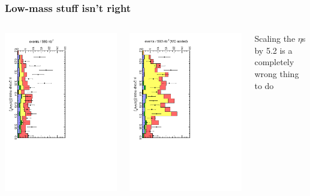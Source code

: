 \documentclass[compress]{beamer}
\begin{document}
\begin{frame}
\frametitle{Low-mass stuff isn't right}

\begin{columns}
\includegraphics[height=\linewidth, angle=90]{Mu9_mass_eta.pdf}

\includegraphics[height=\linewidth, angle=90]{Mu9_mass_eta_scaled.pdf}

Scaling the $\eta$s by 5.2 is a completely wrong thing to do
\end{columns}
\end{frame}
\end{document}
